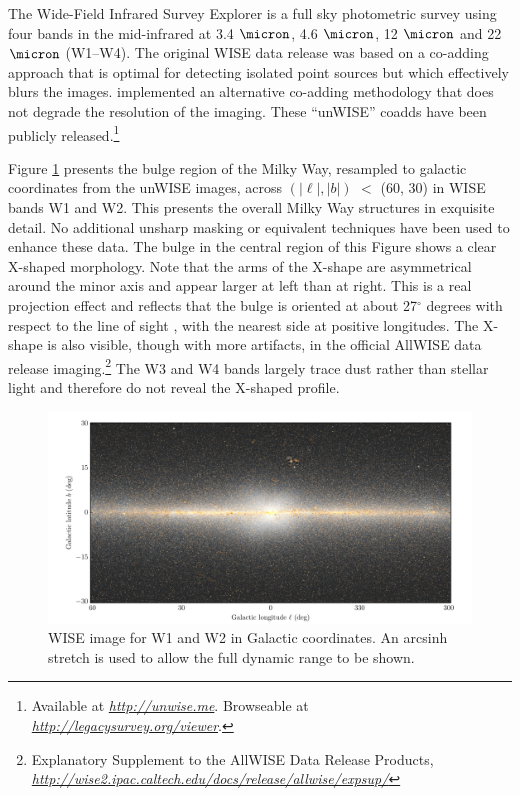 \documentclass[12pt, preprint]{aastex}
\newcommand{\niceurl}[1]{\href{#1}{\textsl{#1}}}
\newcommand{\viewerurl}{\niceurl{http://legacysurvey.org/viewer}}
\begin{document}
The Wide-Field Infrared Survey Explorer \citep[WISE;][]{W2010} is a full sky photometric survey using four bands in the mid-infrared at 3.4 $\micron$, 4.6 $\micron$, 12 $\micron$ and 22 $\micron$ (W1--W4). The original WISE data release was based on a co-adding approach that is optimal for detecting isolated point sources but which effectively blurs the images. \citet{Lang2014a} implemented an alternative co-adding methodology that does not degrade the resolution of the imaging.  These ``unWISE'' coadds have been publicly released.\footnote{Available at \niceurl{http://unwise.me}. Browseable at \viewerurl.}

Figure \ref{fig:xbulge} presents the bulge region of the Milky Way,  resampled to galactic coordinates from the unWISE images, across $(|\ell|,|b|)$ $<$ (60, 30) in WISE bands W1 and W2.  This presents the overall Milky Way structures in exquisite detail.
No additional unsharp masking or equivalent techniques have been used to enhance these data. The bulge in the central region of this Figure shows a clear X-shaped morphology. Note that the arms of the X-shape are asymmetrical around the minor axis and appear larger at left than at right. This is a real projection effect and reflects that the bulge is oriented at about 27$^\circ$ degrees with respect to the line of sight \citep{Wegg2013}, with the nearest side at positive longitudes. The X-shape is also visible, though with more artifacts, in the official AllWISE data release imaging.\footnote{Explanatory
  Supplement to the AllWISE Data Release Products, 
  \niceurl{http://wise2.ipac.caltech.edu/docs/release/allwise/expsup/}}
%
The W3 and W4 bands largely trace dust rather than stellar light and therefore
do not reveal the X-shaped profile.

\begin{figure}[h!]
\centering
        \includegraphics[width=\textwidth]{xbulge-00}
\caption{WISE image for W1 and W2 in Galactic coordinates.  An arcsinh
  stretch is used to allow the full dynamic range to be shown.}
\label{fig:xbulge}
\end{figure}
\end{document}
